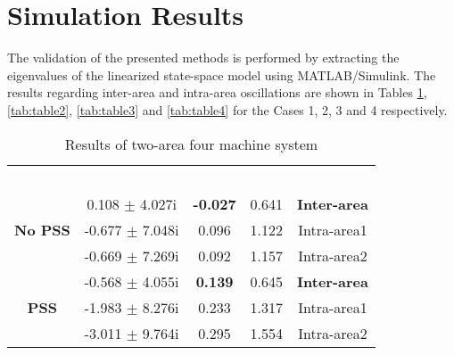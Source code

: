 \documentclass[conference,11pt]{IEEEtran}
\begin{document}
\section{Simulation Results}\label{s:results}
The validation of the presented methods is performed by extracting the eigenvalues of the linearized state-space model using MATLAB/Simulink. The results regarding inter-area and intra-area oscillations are shown in Tables \ref{tab:table1}, \ref{tab:table2}, \ref{tab:table3} and \ref{tab:table4} for the Cases 1, 2, 3 and 4 respectively.

\begin{table}[t]
\centering
\caption{Results of two-area four machine system}
\label{tab:table1}
\renewcommand{\arraystretch}{1}
\begin{tabular}{||c|c|c|c|c||}
\hline
\hline
\multirow{2}{*}{\parbox{1.1cm}{\\}}  & 
\multirow{2}{*}{\parbox{1.4cm}{}} & 
\multirow{2}{*}{\parbox{1.1cm}{}} & 
\multirow{2}{*}{\parbox{0.8cm}{}} & 
\multirow{2}{*}{\parbox{1.2cm}{}}  \\
{}     &       {}      &    {} &      {}     &       {} \\ \hline
\hline
\multirow{3}{*}{\bf {No PSS}}     &0.108 $\pm$ 4.027i     & \bf{-0.027} & 0.641 & \bf{Inter-area}\\
{}                          &-0.677 $\pm$ 7.048i	&  0.096 & 1.122 & Intra-area1\\
{}                          &-0.669 $\pm$ 7.269i	&  0.092 & 1.157 & Intra-area2\\ \hline
\multirow{3}{*}{\bf {PSS}}        &-0.568 $\pm$ 4.055i    & \bf{0.139}  & 0.645 & \bf{Inter-area}\\
{}                          &-1.983 $\pm$ 8.276i	&  0.233 & 1.317 & Intra-area1\\
{}                          &-3.011 $\pm$ 9.764i	&  0.295 & 1.554 & Intra-area2\\ \hline
\hline
\end{tabular}
\vspace{-0.20in}
\end{table}
\end{document}
